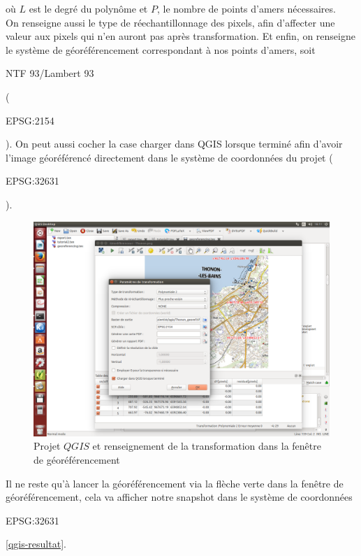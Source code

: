 \documentclass{book}
\begin{document}
où $L$ est le degré du polyn\^{o}me et $P$, le nombre de points d'amers nécessaires.\\
On renseigne aussi le type de réechantillonnage des pixels, afin d'affecter une valeur aux pixels qui n'en auront pas
après transformation. Et enfin, on renseigne le système de géoréférencement correspondant 
à nos points d'amers, soit \begin{itshape}NTF 93/Lambert 93\end{itshape} (\begin{itshape}EPSG:2154\end{itshape}). On peut aussi
 cocher la case \og charger dans QGIS lorsque terminé \fg{} afin d'avoir l'image géoréférencé directement
 dans le système de coordonnées du projet (\begin{itshape}EPSG:32631\end{itshape}).

\begin{figure}[H]
\begin{center}
\includegraphics[scale=0.3]{images/qgis-transformation.png}
\end{center}
\caption{Projet $QGIS$ et renseignement de la transformation dans la fen\^{e}tre de géoréférencement}
\label{qgis-transformation}
\end{figure}

\clearpage

Il ne reste qu'à lancer la géoréférencement via la flèche verte dans la fen\^{e}tre de géoréférencement, cela va afficher
notre snapshot dans le système de coordonnées \begin{itshape}EPSG:32631\end{itshape} \ref{qgis-resultat}.
\end{document}
